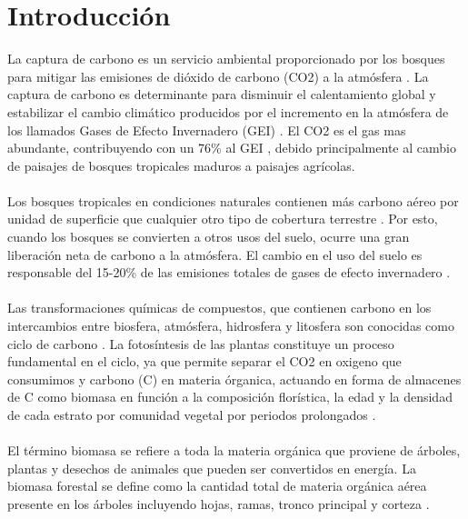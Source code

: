 \newpage{\ } 
\thispagestyle{empty} 

\chapter{Introducci\'on}

La captura de carbono es un servicio ambiental proporcionado por los bosques para mitigar las emisiones de di\'oxido de carbono (CO2) a la atm\'osfera \cite{peralta2013analisis}. La captura de carbono es determinante para disminuir el calentamiento global y estabilizar el cambio clim\'atico producidos por el incremento en la atm\'osfera de los llamados Gases de Efecto Invernadero (GEI) \cite{marquezestimacion}. El CO2 es el gas mas abundante, contribuyendo con un 76\% al GEI \cite{avila2001almacenamiento}, debido principalmente al cambio de paisajes de bosques tropicales maduros a paisajes agr\'icolas.\\~\\
Los bosques tropicales en condiciones naturales contienen m\'as carbono a\'ereo por unidad de superficie que cualquier otro tipo de cobertura terrestre \cite{gibbs2007monitoring}. Por esto, cuando los bosques se convierten a otros usos del suelo, ocurre una gran liberaci\'on neta de carbono a la atm\'osfera. El cambio en el uso del suelo es responsable del 15-20\% de las emisiones totales de gases de efecto invernadero \cite{peralta2013analisis}.\\~\\
Las transformaciones qu\'imicas de compuestos, que contienen carbono en los intercambios entre biosfera, atm\'osfera, hidrosfera y litosfera son conocidas como ciclo de carbono \cite{wikixxx}. La fotos\'intesis de las plantas constituye un proceso fundamental en el ciclo, ya que permite separar  el CO2 en oxigeno que consumimos y carbono (C) en materia \'organica, actuando en forma de almacenes de C como biomasa en funci\'on a la composici\'on flor\'istica, la edad y la densidad de cada estrato por comunidad vegetal por periodos prolongados \cite{acosta2003diseno}.\\~\\
El t\'ermino biomasa se refiere a toda la materia org\'anica que proviene de \'arboles, plantas y desechos de animales que pueden ser convertidos en energ\'ia. La biomasa forestal se define como la cantidad total de materia org\'anica a\'erea presente en los \'arboles incluyendo hojas, ramas, tronco principal y corteza \cite{garzuglia2003wood}.\\~\\
